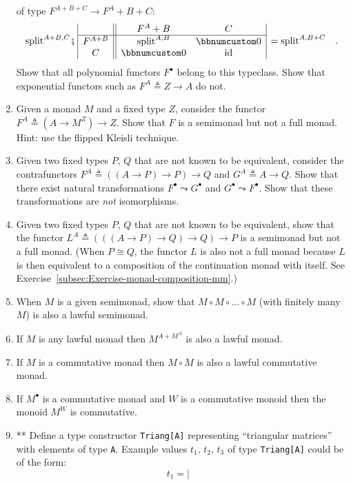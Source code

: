 \begin{enumerate}
of type $F^{A+B+C}\rightarrow F^{A}+B+C$:
\[
\text{split}^{A+B,C}\bef\,\begin{array}{|c||cc|}
 & F^{A}+B & C\\
\hline F^{A+B} & \text{split}^{A,B} & \bbnum 0\\
C & \bbnum 0 & \text{id}
\end{array}\,=\text{split}^{A,B+C}\quad.
\]
Show that all polynomial functors $F^{\bullet}$ belong to this typeclass.
Show that exponential functors such as $F^{A}\triangleq Z\rightarrow A$
do not.
\item Given a monad $M$ and a fixed type $Z$, consider the functor $F^{A}\triangleq(A\rightarrow M^{Z})\rightarrow Z$.
Show that $F$ is a semimonad but not a full monad. Hint: use the
flipped Kleisli technique.
\item Given two fixed types $P$, $Q$ that are not known to be equivalent,
consider the contrafunctors $F^{A}\triangleq\left(\left(A\rightarrow P\right)\rightarrow P\right)\rightarrow Q$
and $G^{A}\triangleq A\rightarrow Q$. Show that there exist natural
transformations $F^{\bullet}\leadsto G^{\bullet}$ and $G^{\bullet}\leadsto F^{\bullet}$.
Show that these transformations are \emph{not} isomorphisms.
\item Given two fixed types $P$, $Q$ that are not known to be equivalent,
show that the functor $L^{A}\triangleq\left(\left(\left(A\rightarrow P\right)\rightarrow Q\right)\rightarrow Q\right)\rightarrow P$
is a semimonad but not a full monad. (When $P\cong Q$, the functor
$L$ is also not a full monad because $L$ is then equivalent to a
composition of the continuation monad with itself. See Exercise~\ref{subsec:Exercise-monad-composition-mm}.)
\item When $M$ is a given semimonad, show that $M\circ M\circ...\circ M$
(with finitely many $M$) is also a lawful semimonad.
\item If $M$ is any lawful monad then $M^{A+M^{A}}$ is also a lawful monad.
\item If $M$ is a commutative monad then $M\circ M$ is also a lawful commutative
monad.
\item If $M^{\bullet}$ is a commutative monad and $W$ is a commutative
monoid then the monoid $M^{W}$ is commutative.
\item {*}{*} Define a type constructor \lstinline!Triang[A]! representing
\textsf{``}triangular matrices\textsf{''} with elements of type \lstinline!A!. Example
values $t_{1}$, $t_{2}$, $t_{3}$ of type \lstinline!Triang[A]!
could be of the form:
\[
t_{1}=\left|\begin{array}{c}

\end{array}\]
\end{enumerate}
